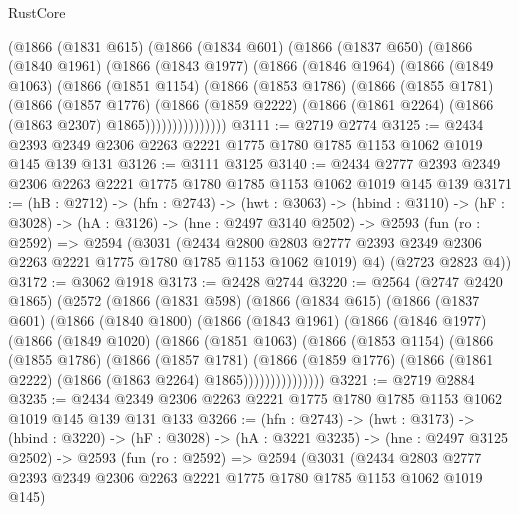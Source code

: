 \begin{lexlean}{RustCore}
\begin{coremodule}
      (@1866
        (@1831 @615)
        (@1866
          (@1834 @601)
          (@1866
            (@1837 @650)
            (@1866
              (@1840 @1961)
              (@1866
                (@1843 @1977)
                (@1866
                  (@1846 @1964)
                  (@1866
                    (@1849 @1063)
                    (@1866
                      (@1851 @1154)
                      (@1866
                        (@1853 @1786)
                        (@1866
                          (@1855 @1781)
                          (@1866
                            (@1857 @1776)
                            (@1866
                              (@1859 @2222)
                              (@1866 (@1861 @2264) (@1866 (@1863 @2307) @1865)))))))))))))))
@3111 := @2719 @2774
@3125 := @2434 @2393 @2349 @2306 @2263 @2221 @1775 @1780 @1785 @1153 @1062 @1019 @145 @139 @131
@3126 := @3111 @3125
@3140 := @2434 @2777 @2393 @2349 @2306 @2263 @2221 @1775 @1780 @1785 @1153 @1062 @1019 @145 @139
@3171 := (hB : @2712) ->
  (hfn : @2743) ->
  (hwt : @3063) ->
  (hbind : @3110) ->
  (hF : @3028) ->
  (hA : @3126) ->
  (hne : @2497 @3140 @2502) ->
  @2593
    (fun (ro : @2592) =>
    @2594
      (@3031
        (@2434 @2800 @2803 @2777 @2393 @2349 @2306 @2263 @2221 @1775 @1780 @1785 @1153 @1062 @1019)
        @4)
      (@2723 @2823 @4))
@3172 := @3062 @1918
@3173 := @2428 @2744
@3220 := @2564
    (@2747 @2420 @1865)
    (@2572
      (@1866
        (@1831 @598)
        (@1866
          (@1834 @615)
          (@1866
            (@1837 @601)
            (@1866
              (@1840 @1800)
              (@1866
                (@1843 @1961)
                (@1866
                  (@1846 @1977)
                  (@1866
                    (@1849 @1020)
                    (@1866
                      (@1851 @1063)
                      (@1866
                        (@1853 @1154)
                        (@1866
                          (@1855 @1786)
                          (@1866
                            (@1857 @1781)
                            (@1866
                              (@1859 @1776)
                              (@1866 (@1861 @2222) (@1866 (@1863 @2264) @1865)))))))))))))))
@3221 := @2719 @2884
@3235 := @2434 @2349 @2306 @2263 @2221 @1775 @1780 @1785 @1153 @1062 @1019 @145 @139 @131 @133
@3266 := (hfn : @2743) ->
  (hwt : @3173) ->
  (hbind : @3220) ->
  (hF : @3028) ->
  (hA : @3221 @3235) ->
  (hne : @2497 @3125 @2502) ->
  @2593
    (fun (ro : @2592) =>
    @2594
      (@3031
        (@2434 @2803 @2777 @2393 @2349 @2306 @2263 @2221 @1775 @1780 @1785 @1153 @1062 @1019 @145)

\end{coremodule}
\end{lexlean}
